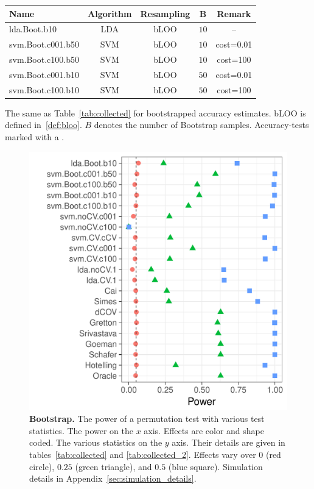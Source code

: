 \documentclass[]{bio}
\begin{document}
\begin{tcolorbox}
	\centering
	\footnotesize
	\begin{tabular}{l|c|c|c|c}
		Name & Algorithm & Resampling & B  & Remark\\ 
		\hline
		\hline
		\cue lda.Boot.b10 & LDA & bLOO 	& $10$ &  -- \\ 
		\cue svm.Boot.c001.b50 & SVM & bLOO 	& $10$ & cost=0.01 \\ 
		\cue svm.Boot.c100.b50 & SVM & bLOO 	& $10$ & cost=100 \\ 
		\cue svm.Boot.c001.b10 & SVM & bLOO 	& $50$ & cost=0.01 \\ 
		\cue svm.Boot.c100.b10 & SVM & bLOO 	& $50$ & cost=100 \\ 
	\end{tabular} 
	\captionsetup{type=table}
	\caption{\footnotesize
		The same as Table~\ref{tab:collected} for bootstrapped accuracy estimates. 
		bLOO is defined in~\ref{def:bloo}.
		$B$ denotes the number of Bootstrap samples.
		Accuracy-tests marked with a \cue.} 
	\label{tab:collected_2}
\end{tcolorbox}


\begin{figure}[ht]
	\centering
	\includegraphics[width=0.7\columnwidth]{"art/file13"}
	\caption{
		\textbf{Bootstrap.}
		The power of a permutation test with various test statistics. 
		The power on the $x$ axis. 
		Effects are color and shape coded. 
		The various statistics on the $y$ axis. 
		Their details are given in tables~\ref{tab:collected} and \ref{tab:collected_2}. 
		Effects vary over $0$ (red circle), $0.25$ (green triangle), and $0.5$ (blue square). 
		Simulation details in Appendix~\ref{sec:simulation_details}.
	} 
	\label{fig:bootstrap}
\end{figure}
\end{document}
